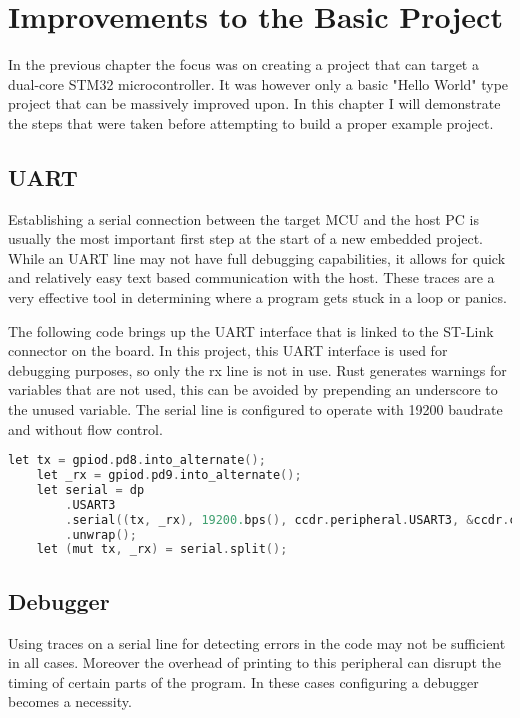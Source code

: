 \chapter{Improvements to the Basic Project}

In the previous chapter the focus was on creating a project that can target a dual-core STM32 microcontroller. It was however only a basic "Hello World" type project that can be massively improved upon. In this chapter I will demonstrate the steps that were taken before attempting to build a proper example project.

\section{UART}

Establishing a serial connection between the target MCU and the host PC is usually the most important first step at the start of a new embedded project. While an UART line may not have full debugging capabilities, it allows for quick and relatively easy text based communication with the host. These traces are a very effective tool in determining where a program gets stuck in a loop or panics.

The following code brings up the UART interface that is linked to the ST-Link connector on the board. In this project, this UART interface is used for debugging purposes, so only the rx line is not in use. Rust generates warnings for variables that are not used, this can be avoided by prepending an underscore to the unused variable. The serial line is configured to operate with 19200 baudrate and without flow control.

\begin{lstlisting}[language=C,frame=single,float=!ht]
    let tx = gpiod.pd8.into_alternate();
    let _rx = gpiod.pd9.into_alternate();
    let serial = dp
        .USART3
        .serial((tx, _rx), 19200.bps(), ccdr.peripheral.USART3, &ccdr.clocks)
        .unwrap();
    let (mut tx, _rx) = serial.split();
\end{lstlisting}

\section{Debugger}

Using traces on a serial line for detecting errors in the code may not be sufficient in all cases. Moreover the overhead of printing to this peripheral can disrupt the timing of certain parts of the program. In these cases configuring a debugger becomes a necessity.

